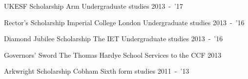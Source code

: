 \begin{cvawards}

\cvaward
  {UKESF Scholarship}
  {Arm}
  {Undergraduate studies}
  {2013~-~'17}

\cvaward
  {Rector's Scholarship}
  {Imperial College London}
  {Undergraduate studies}
  {2013~-~'16}

\cvaward
  {Diamond Jubilee Scholarship}
  {The IET}
  {Undergraduate studies}
  {2013~-~'16}

\cvaward
  {Governors' Sword}
  {The Thomas Hardye School}
  {Services to the CCF}
  {2013}

\cvaward
  {Arkwright Scholarship}
  {Cobham}
  {Sixth form studies}
  {2011~-~'13}

\end{cvawards}
